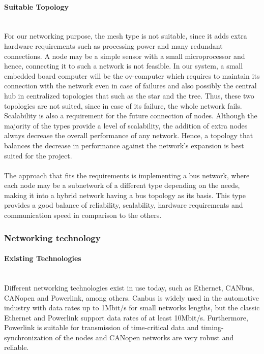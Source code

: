 \paragraph{Suitable Topology}~\\
For our networking purpose, the mesh type is not suitable, since it adds extra hardware requirements such as processing power and many redundant connections.
A node may be a simple sensor with a small microprocessor and hence, connecting it to such a network is not feasible.
In our system, a small embedded board computer will be the ov-computer which requires to maintain its connection with the network even in case of failures and also possibly the central hub in centralized topologies that such as the star and the tree.
Thus, these two topologies are not suited, since in case of its failure, the whole network fails.
Scalability is also a requirement for the future connection of nodes.
Although the majority of the types provide a level of scalability, the addition of extra nodes always decrease the overall performance of any network.
Hence, a topology that balances the decrease in performance against the network's expansion is best suited for the project.\\\\
The approach that fits the requirements is implementing a bus network, where each node may be a subnetwork of a different type depending on the needs, making it into a hybrid network having a bus topology as its basis.
This type provides a good balance of reliability, scalability, hardware requirements and communication speed in comparison to the others.

\subsubsection{Networking technology}

\paragraph{Existing Technologies}~\\
Different networking technologies exist in use today, such as Ethernet, CANbus, CANopen and Powerlink, among others.
Canbus is widely used in the automotive industry with data rates up to 1Mbit/s for small networks lengths, but the classic Ethernet and Powerlink support data rates of at least 10Mbit/s.
Furthermore, Powerlink is suitable for transmission of time-critical data and timing-synchronization of the nodes and CANopen networks are very robust and reliable.
